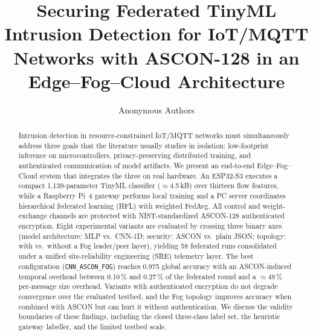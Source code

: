 \documentclass[runningheads]{llncs}
\begin{document}
\title{Securing Federated TinyML Intrusion Detection for IoT/MQTT Networks with ASCON-128 in an Edge--Fog--Cloud Architecture}

\author{Anonymous Authors}

\maketitle

\begin{abstract}
Intrusion detection in resource-constrained IoT/MQTT networks must
simultaneously address three goals that the literature usually studies in
isolation: low-footprint inference on microcontrollers, privacy-preserving
distributed training, and authenticated communication of model artifacts.
We present an end-to-end Edge--Fog--Cloud system that integrates the three
on real hardware. An ESP32-S3 executes a compact 1{,}139-parameter TinyML
classifier ($\approx$4.5\,kB) over thirteen flow features, while a Raspberry
Pi~4 gateway performs local training and a PC server coordinates
hierarchical federated learning (HFL) with weighted FedAvg.
All control and weight-exchange channels are protected with NIST-standardized
ASCON-128 authenticated encryption. Eight experimental variants are evaluated
by crossing three binary axes (model architecture: MLP vs.\ CNN-1D; security:
ASCON vs.\ plain JSON; topology: with vs.\ without a Fog leader/peer layer),
yielding 58 federated runs consolidated under a unified site-reliability
engineering (SRE) telemetry layer. The best configuration
(\texttt{CNN\_ASCON\_FOG}) reaches 0.975 global accuracy with an
ASCON-induced temporal overhead between 0.10\,\% and 0.27\,\% of the
federated round and a $\approx$48\,\% per-message size overhead. Variants
with authenticated encryption do not degrade convergence over the evaluated
testbed, and the Fog topology improves accuracy when combined with ASCON
but can hurt it without authentication. We discuss the validity boundaries of
these findings, including the closed three-class label set, the heuristic
gateway labeller, and the limited testbed scale.

\end{abstract}
\end{document}
